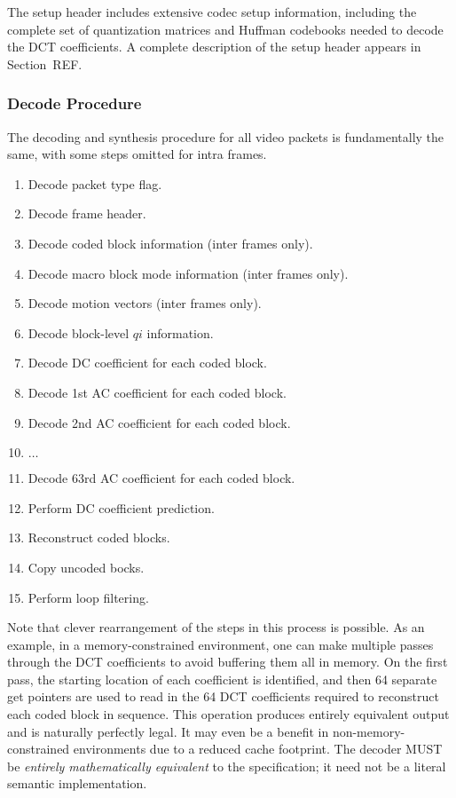 \documentclass[11pt,letterpaper]{article}
\newcommand{\qi}{\ensuremath{\mathit{qi}} }
\begin{document}
The setup header includes extensive codec setup information, including the
 complete set of quantization matrices and Huffman codebooks needed to decode
 the DCT coefficients.
A complete description of the setup header appears in Section~REF.

\subsubsection{Decode Procedure}

The decoding and synthesis procedure for all video packets is fundamentally the
 same, with some steps omitted for intra frames.
\begin{enumerate}
\item
Decode packet type flag.
\item
Decode frame header.
\item
Decode coded block information (inter frames only).
\item
Decode macro block mode information (inter frames only).
\item
Decode motion vectors (inter frames only).
\item
Decode block-level \qi information.
\item
Decode DC coefficient for each coded block.
\item
Decode 1st AC coefficient for each coded block.
\item
Decode 2nd AC coefficient for each coded block.
\item
$\ldots$
\item
Decode 63rd AC coefficient for each coded block.
\item Perform DC coefficient prediction.
\item Reconstruct coded blocks.
\item Copy uncoded bocks.
\item Perform loop filtering.
\end{enumerate}

Note that clever rearrangement of the steps in this process is possible.
As an example, in a memory-constrained environment, one can make multiple
 passes through the DCT coefficients to avoid buffering them all in memory.
On the first pass, the starting location of each coefficient is identified, and
 then 64 separate get pointers are used to read in the 64 DCT coefficients
 required to reconstruct each coded block in sequence.
This operation produces entirely equivalent output and is naturally perfectly
 legal.
It may even be a benefit in non-memory-constrained environments due to a
 reduced cache footprint.
The decoder MUST be {\em entirely mathematically equivalent} to the
 specification; it need not be a literal semantic implementation.
\end{document}
